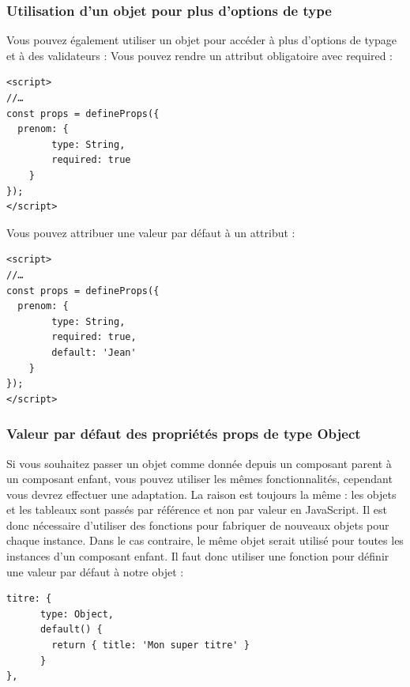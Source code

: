 \documentclass{article}
\begin{document}
\subsubsection{Utilisation d'un objet pour plus d'options de type}
Vous pouvez également utiliser un objet pour accéder à plus d'options de typage et à des validateurs : Vous pouvez rendre un attribut obligatoire avec {\color{monOrange}required} :
\begin{verbatim}
<script>
//…
const props = defineProps({
  prenom: {
        type: String,
        required: true
    }
});
</script>
\end{verbatim}
Vous pouvez attribuer une valeur par défaut à un attribut :
\begin{verbatim}
<script>
//…
const props = defineProps({
  prenom: {
        type: String,
        required: true,
        default: 'Jean'
    }
});
</script>
\end{verbatim}

\subsubsection{Valeur par défaut des propriétés {\color{monOrange}props} de type {\color{monOrange}Object}}
Si vous souhaitez passer un objet comme donnée depuis un composant parent à un composant enfant, vous pouvez utiliser les mêmes fonctionnalités, cependant vous devrez effectuer une adaptation. La raison est toujours la même : les objets et les tableaux sont passés par référence et non par valeur en JavaScript. Il est donc nécessaire d'utiliser des fonctions pour fabriquer de nouveaux objets pour chaque instance. Dans le cas contraire, le même objet serait utilisé pour toutes les instances d'un composant enfant. Il faut donc utiliser une fonction pour définir une valeur par défaut à notre objet :
\begin{verbatim}
titre: {
      type: Object,
      default() {
        return { title: 'Mon super titre' }
      }
},
\end{verbatim}
\end{document}
